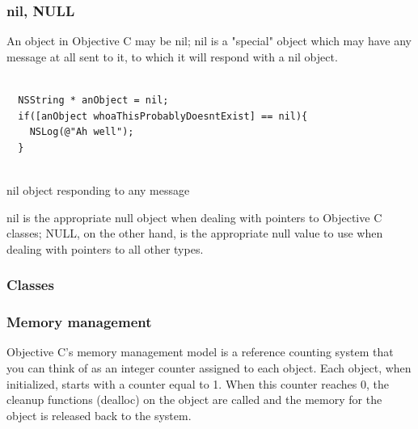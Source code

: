 \documentclass[10pt]{beamer}
\begin{document}
    
\begin{frame}[fragile]
  \frametitle{nil, NULL}
  An object in Objective C may be nil; nil is a "special" object which may have any message at all sent to it, to which it will respond with a nil object.
\begin{listing}[H]
    \begin{verbatim}
  
  NSString * anObject = nil;
  if([anObject whoaThisProbablyDoesntExist] == nil){
    NSLog(@"Ah well");
  }
            
  \end{verbatim}
    \caption{nil object responding to any message}
    \label{listing:5}
  \end{listing}

nil is the appropriate null object when dealing with pointers to Objective C classes; NULL, on the other hand, is the appropriate null value to use when dealing with pointers to all other types.

\end{frame}

    
\begin{frame}[fragile]
  \frametitle{Classes}
  
\end{frame}

    
\begin{frame}[fragile]
  \frametitle{Memory management}
  Objective C's memory management model is a reference counting system that you can think of as an integer counter assigned to each object. Each object, when initialized, starts with a counter equal to 1.  When this counter reaches 0, the cleanup functions (dealloc) on the object are called and the memory for the object is released back to the system.

\end{frame}
\end{document}
